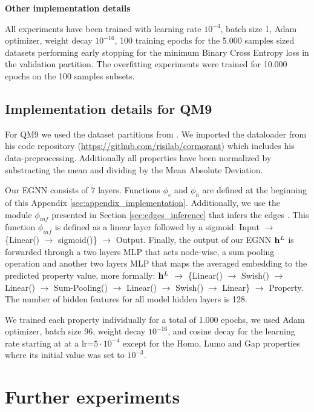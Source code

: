 \textbf{Other implementation details}

All experiments have been trained with learning rate $10^{-4}$, batch size 1, Adam optimizer,  weight decay $10^{-16}$, 100 training epochs for the 5.000 samples sized datasets performing early stopping for the minimum Binary Cross Entropy loss in the validation partition. The overfitting experiments were trained for 10.000 epochs on the 100 samples subsets.

\subsection{Implementation details for QM9}
\label{sec:appendix_implementation_qm9_dataset}
For QM9 \cite{ramakrishnan2014quantum} we used the dataset partitions from \cite{anderson2019cormorant}. We imported the dataloader from his code repository (\hyperlink{https://github.com/risilab/cormorant}{https://github.com/risilab/cormorant}) which includes his data-preprocessing. Additionally all properties have been normalized by substracting the mean and dividing by the Mean Absolute Deviation.

Our EGNN consists of 7 layers. Functions $\phi_e$ and $\phi_h$ are defined at the beginning of this Appendix \ref{sec:appendix_implementation}. Additionally, we use the module $\phi_{inf}$ presented in Section \ref{sec:edges_inference} that infers the edges . This function $\phi_{inf}$ is defined as a linear layer followed by a sigmoid: Input $\xrightarrow{}$ \{Linear() $\xrightarrow{}$ sigmoid()\} $\xrightarrow{}$ Output. Finally, the output of our EGNN $\mathbf{h}^L$ is forwarded through a two layers MLP that acts node-wise, a sum pooling operation and another two layers MLP that maps the averaged embedding to the predicted property value, more formally: $\mathbf{h}^L$ $\xrightarrow{}$ \{Linear() $\xrightarrow{}$ Swish() $\xrightarrow{}$ Linear() $\xrightarrow{}$ Sum-Pooling() $\xrightarrow{}$ Linear() $\xrightarrow{}$ Swish() $\xrightarrow{}$ Linear\} $\xrightarrow{}$ Property. The number of hidden features for all model hidden layers is 128.

We trained each property individually for a total of 1.000 epochs, we used Adam optimizer, batch size 96, weight decay $10^{-16}$, and cosine decay for the learning rate starting at at a lr=$5\cdot10^{-4}$ except for the Homo, Lumo and Gap properties where its initial value was set to $10^{-3}$.

\section{Further experiments}

